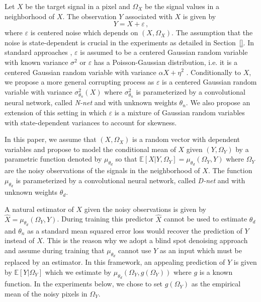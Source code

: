 \documentclass{article}
\begin{document}
Let $X$ be the target signal in a pixel and $\Omega_X$ be the signal values in a neighborhood of $X$.  The observation $Y$ associated with $X$  is given by
\begin{equation}
\label{eq:def:Y}
Y = X + \varepsilon\,,
\end{equation}
where $\varepsilon$ is centered noise which depends on $(X,\Omega_X)$. The assumption that the noise is state-dependent is crucial in the experiments as detailed in Section~\ref{}. In standard approaches \cite{},  $\varepsilon$ is assumed to be a centered Gaussian random variable with known variance $\sigma^2$ \cite{} or $\varepsilon$ has a Poisson-Gaussian distribution, i.e. it  is a centered Gaussian random variable with variance $\alpha X + \eta^2$ \cite{}.
Conditionally to $X$, we propose a more general corrupting process as $\varepsilon$ is a centered Gaussian random variable with variance $\sigma^2_{\theta_n}(X)$ where $\sigma^2_{\theta_n}$ is parameterized by a convolutional neural network, called \textit{N-net} and with unknown weights $\theta_n$. We also propose an extension of this setting in which $\varepsilon$ is a mixture of Gaussian random variables with state-dependent variances to account for skewness.

In this paper, we assume that $(X,\Omega_X)$ is a random vector with dependent variables and propose to model the conditional mean of $X$ given $(Y,\Omega_Y)$ by a parametric function denoted by $\mu_{\theta_d}$ so that $\mathbb{E}[X|Y,\Omega_Y] = \mu_{\theta_d}(\Omega_Y,Y)$ where $\Omega_Y$ are the noisy observations of the signals in the neighborhood of $X$. The function $ \mu_{\theta_d}$ is parameterized by a convolutional neural network, called \textit{D-net} and with unknown weights $\theta_d$. 

A natural estimator of $X$ given the noisy observations is given by $\widehat X = \mu_{\theta_d}(\Omega_Y,Y)$. During training this predictor $\widehat X$ cannot be used to estimate $\theta_d$ and $\theta_n$ as  a standard mean squared error loss would recover the prediction of $Y$ instead of $X$. This is the reason why we adopt a blind spot denoising approach and assume during training that $\mu_{\theta_d}$ cannot use $Y$ as an input which must be replaced by an estimator. In this framework, an appealing prediction of $Y$ is given by $\mathbb{E}[Y|\Omega_Y]$ which we estimate by $\mu_{\theta_d}(\Omega_Y,g(\Omega_Y))$ where $g$ is a known function. In the experiments below, we chose to set $g(\Omega_Y)$ as the empirical mean of the noisy pixels in $\Omega_Y$.
\end{document}
